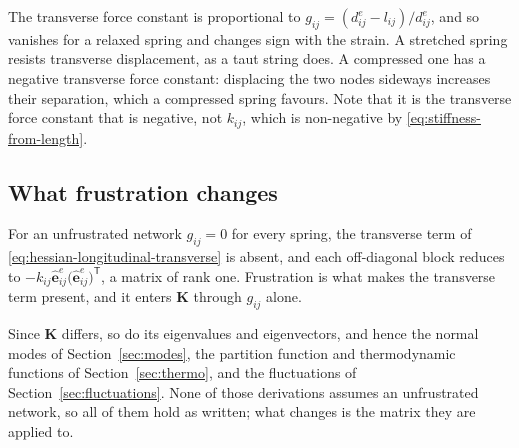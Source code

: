 \documentclass[11pt]{article}
\newcommand{\ee}{\hat{\mathbf{e}}}
\newcommand{\KK}{\mathbf{K}}
\newcommand{\eeije}{\ee^{e}_{ij}}
\newcommand{\dije}{d^{e}_{ij}}
\newcommand{\gij}{g_{ij}}
\newcommand{\lij}{l_{ij}}
\newcommand{\kij}{k_{ij}}
\begin{document}
The transverse force constant is proportional to $\gij = (\dije - \lij)/\dije$, and so
vanishes for a relaxed spring and changes sign with the strain. A stretched spring
resists transverse displacement, as a taut string does. A
compressed one has a negative transverse force constant: displacing the two nodes
sideways increases their separation, which a compressed spring favours. Note that
it is the transverse force constant that is negative, not $\kij$, which is
non-negative by \eqref{eq:stiffness-from-length}.

\subsection*{What frustration changes}

For an unfrustrated network $\gij = 0$ for every spring, the transverse term of
\eqref{eq:hessian-longitudinal-transverse} is absent, and each off-diagonal block
reduces to $-\kij\eeije\big(\eeije\big)^{\mathsf T}$, a matrix of rank one.
Frustration is what makes the transverse term present, and it enters $\KK$ through
$\gij$ alone.

Since $\KK$ differs, so do its eigenvalues and eigenvectors, and hence the normal
modes of Section~\ref{sec:modes}, the partition function and thermodynamic
functions of Section~\ref{sec:thermo}, and the fluctuations of
Section~\ref{sec:fluctuations}. None of those derivations assumes an unfrustrated
network, so all of them hold as written; what changes is the matrix they are
applied to.
\end{document}
